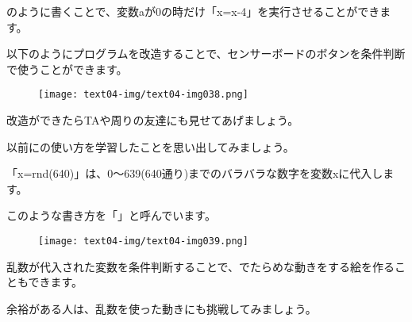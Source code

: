 のように書くことで、変数aが0の時だけ「x=x-4」を実行させることができます。


以下のようにプログラムを改造することで、センサーボードのボタンを条件判断で使うことができます。

\begin{figure}[H]
    \begin{center}
      \texttt{[image: text04-img/text04-img038.png]}
    \end{center}
    \label{fig:prog_menu}
\end{figure}

改造ができたらTAや周りの友達にも見せてあげましょう。


以前にの使い方を学習したことを思い出してみましょう。

「x=rnd(640)」は、0〜639(640通り)までのバラバラな数字を変数xに代入します。

このような書き方を「」と呼んでいます。

\begin{figure}[H]
    \begin{center}
      \texttt{[image: text04-img/text04-img039.png]}
    \end{center}
    \label{fig:prog_menu}
\end{figure}

\begin{description}
    \item {}
    \item {}
    \item {}
\end{description}

乱数が代入された変数を条件判断することで、でたらめな動きをする絵を作ることもできます。

余裕がある人は、乱数を使った動きにも挑戦してみましょう。

